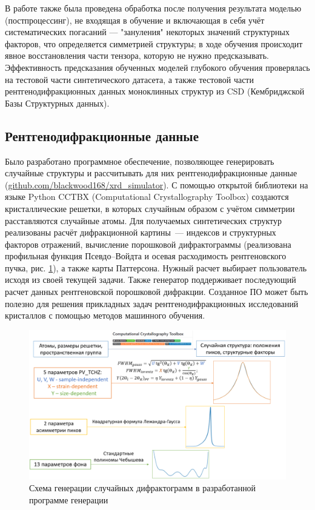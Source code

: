 В работе также была проведена обработка после получения результата моделью (постпроцессинг), не входящая в обучение и включающая в себя учёт систематических погасаний --- "зануления" некоторых значений структурных факторов, что определяется симметрией структуры; в ходе обучения происходит явное восстановления части тензора, которую не нужно предсказывать.
Эффективность предсказания обученных моделей глубокого обучения проверялась на тестовой части синтетического датасета, а также тестовой части рентгенодифракционных данных моноклинных структур из CSD (Кембриджской Базы Структурных данных).

\subsection{Рентгенодифракционные данные}

Было разработано программное обеспечение, позволяющее генерировать случайные структуры и рассчитывать для них рентгенодифракционные данные (\url{github.com/blackwood168/xrd_simulator}). С помощью открытой библиотеки на языке Python CCTBX (Computational Crystallography Toolbox) \cite{grosse-kunstleve_computational_2002} создаются кристаллические решетки, в которых случайным образом с учётом симметрии расставляются случайные атомы. Для получаемых синтетических структур реализованы расчёт дифракционной картины~--- индексов и структурных факторов отражений, вычисление порошковой дифрактограммы (реализована профильная функция Псевдо--Войдта \cite{david_powder_1986} и осевая расходимость рентгеновского пучка, рис. \ref{pxrd}), а также карты Паттерсона. Нужный расчет выбирает пользователь исходя из своей текущей задачи.   Также генератор поддерживает последующий расчет данных рентгеновской порошковой дифракции. Созданное ПО может быть полезно для решения прикладных задач рентгенодифракционных исследований кристаллов с помощью методов машинного обучения. 


\begin{figure}[H]
	\centering
	\includegraphics[width=1\textwidth]{figures/pxrd.png}\hfill
	\caption{Схема генерации случайных дифрактограмм в разработанной программе генерации}
	\label{pxrd}
\end{figure}

